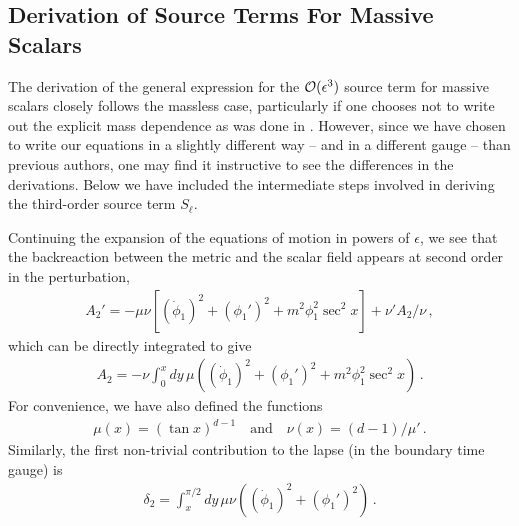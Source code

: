 \documentclass[../PhD.tex]{subfiles}
\begin{document}
\begin{subappendices}

\section{Derivation of Source Terms For Massive Scalars}
\label{app: source term derivation}

The derivation of the general expression for the $\mathcal{O}(\epsilon^3)$ source term for massive scalars closely follows the massless case, particularly if one chooses not to write out the explicit mass dependence as was done in \cite{1810.04753}. However, since we have chosen to write our equations in a slightly different way -- and in a different gauge -- than previous authors, one may find it instructive to see the differences in the derivations. Below we have included the intermediate steps involved in deriving the third-order source term $S_\ell$.

Continuing the expansion of the equations of motion in powers of $\epsilon$, we see that the backreaction between the metric and the scalar field appears at second order in the perturbation,
\begin{align}
A_2' = - \mu \nu \left[ (\dot \phi_1 )^2 + (\phi_1')^2 + m^2 \phi_1^2 \sec^2 x \right] + \nu' A_2 / \nu \, ,
\end{align}
which can be directly integrated to give
\begin{align}
A_2 = -\nu \int^x_0 dy \, \mu \left( (\dot \phi_1 )^2 + (\phi_1')^2 + m^2 \phi_1^2 \sec^2 x \right) \, .
\end{align}
For convenience, we have also defined the functions
\begin{align}
\mu (x) = \left( \tan x \right)^{d-1} \quad \text{and} \quad \nu(x) = (d-1) / \mu ' \, .
\end{align}
Similarly, the first non-trivial contribution to the lapse (in the boundary time gauge) is
\begin{align}
\delta_2 = \int^{\pi/2}_x dy \, \mu \nu \left(  (\dot \phi_1 )^2 + (\phi_1')^2 \right) \, .
\end{align}


\end{subappendices}
\end{document}
